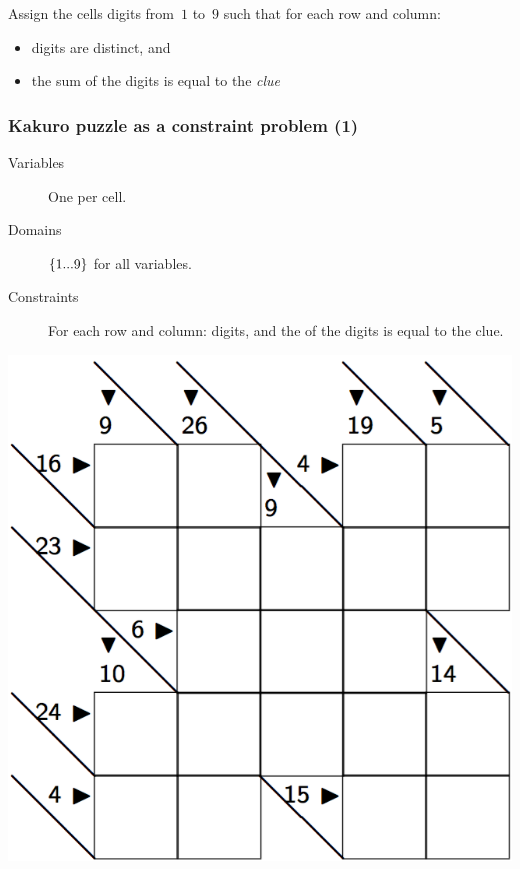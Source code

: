 \documentclass{beamer}
\newcommand{\stressed}[1]{\emph{{\color{red!50}{#1}}}}
\begin{document}
\begin{frame}
  \bigskip

  Assign the cells digits from~$1$ to~$9$ such that for each row and column:
  \begin{itemize}
    \item digits are distinct, and
    \item the sum of the digits is equal to the \emph{clue}
    \end{itemize}

\end{frame}

\begin{frame}
  \frametitle{Kakuro puzzle as a constraint problem (1)}
  \begin{minipage}{0.5\textwidth}
    \begin{description}
      \item[Variables] One per cell.
      \item[Domains] $\left\{1...9\right\}$ for all variables.
      \item[Constraints] For each row and column: \stressed{distinct} digits,
        and the \stressed{sum} of the digits is equal to the clue.
    \end{description} 
  \end{minipage}
  \begin{minipage}{0.45\textwidth}
    \includegraphics[scale=0.2]{kakuro.png}
  \end{minipage}
\end{frame}
\end{document}
